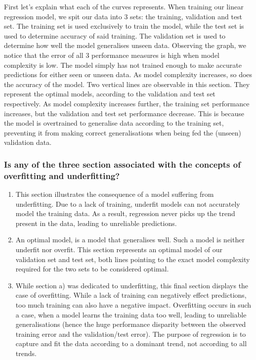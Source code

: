 \documentclass[12pt,a4paper]{article}
\begin{document}
First let's explain what each of the curves represents. When training our linear regression model, we spit our data into 3 sets: the training, validation and test set. The training set is used exclusively to train the model, while the test set is used to determine accuracy of said training. The validation set is used to determine how well the model generalises unseen data. Observing the graph, we notice that the error of all 3 performance measures is high when model complexity is low. The model simply has not trained enough to make accurate predictions for either seen or unseen data. 
\newpage
As model complexity increases, so does the accuracy of the model. Two vertical lines are observable in this section. They represent the optimal models, according to the validation and test set respectively. As model complexity increases further, the training set performance increases, but the validation and test set performance decrease. This is because the model is overtrained to generalise data according to the training set, preventing it from making correct generalisations when being fed the (unseen) validation data.

\subsubsection*{Is any of the three section associated with the concepts of overfitting and underfitting?}

\begin{enumerate}[label=\alph*)]
\itemsep-0.25em 
	\item This section illustrates the consequence of a model suffering from underfitting. Due to a lack of training, underfit models can not accurately model the training data. As a result, regression never picks up the trend present in the data, leading to unreliable predictions.
	\item An optimal model, is a model that generalises well. Such a model is neither underfit nor overfit. This section represents an optimal model of our validation set and test set, both lines pointing to the exact model complexity required for the two sets to be considered optimal.
	\item While section a) was dedicated to underfitting, this final section displays the case of overfitting. While a lack of training can negatively effect predictions, too much training can also have a negative impact. Overfitting occurs in such a case, when a model learns the training data too well, leading to unreliable generalisations (hence the huge performance disparity between the observed training error and the validation/test error). The purpose of regression is to capture and fit the data according to a dominant trend, not according to all trends.
\end{enumerate}
\end{document}
